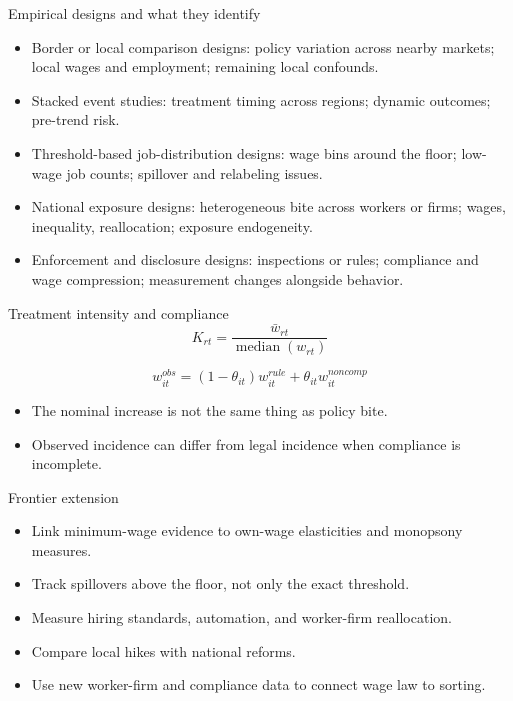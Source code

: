 \documentclass[aspectratio=169,11pt]{beamer}
\begin{document}
\begin{frame}{Empirical designs and what they identify}
\begin{itemize}
    \item Border or local comparison designs: policy variation across nearby markets; local wages and employment; remaining local confounds.
    \item Stacked event studies: treatment timing across regions; dynamic outcomes; pre-trend risk.
    \item Threshold-based job-distribution designs: wage bins around the floor; low-wage job counts; spillover and relabeling issues.
    \item National exposure designs: heterogeneous bite across workers or firms; wages, inequality, reallocation; exposure endogeneity.
    \item Enforcement and disclosure designs: inspections or rules; compliance and wage compression; measurement changes alongside behavior.
\end{itemize}
\end{frame}

\begin{frame}{Treatment intensity and compliance}
\[
K_{rt} = \frac{\bar w_{rt}}{\operatorname{median}(w_{rt})}
\]

\[
w_{it}^{obs} = (1-\theta_{it}) w_{it}^{rule} + \theta_{it} w_{it}^{noncomp}
\]

\begin{itemize}
    \item The nominal increase is not the same thing as policy bite.
    \item Observed incidence can differ from legal incidence when compliance is incomplete.
\end{itemize}
\end{frame}

\begin{frame}{Frontier extension}
\begin{itemize}
    \item Link minimum-wage evidence to own-wage elasticities and monopsony measures.
    \item Track spillovers above the floor, not only the exact threshold.
    \item Measure hiring standards, automation, and worker-firm reallocation.
    \item Compare local hikes with national reforms.
    \item Use new worker-firm and compliance data to connect wage law to sorting.
\end{itemize}
\end{frame}
\end{document}
